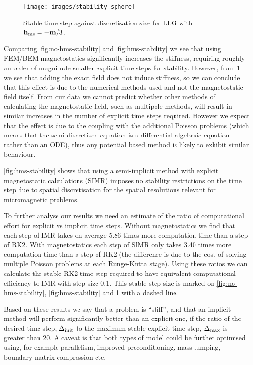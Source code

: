 \begin{figure}
  \centering
  \texttt{[image: images/stability\_sphere]}
  \caption{Stable time step against discretisation size for LLG with $\boldsymbol{\mathrm{h}}_{\text{ms}} = - \boldsymbol{\mathrm{m}} / 3$.
  }
  \label{fig:analytic-hms-stability}
\end{figure}

Comparing \cref{fig:no-hms-stability} and \ref{fig:hms-stability} we see that using FEM/BEM magnetostatics significantly increases the stiffness, requiring roughly an order of magnitude smaller explicit time steps for stability.
However, from \cref{fig:analytic-hms-stability} we see that adding the exact field does not induce stiffness, so we can conclude that this effect is due to the numerical methods used and not the magnetostatic field itself.
From our data we cannot predict whether other methods of calculating the magnetostatic field, such as multipole methods, will result in similar increases in the number of explicit time steps required.
However we expect that the effect is due to the coupling with the additional Poisson problems (which means that the semi-discretised equation is a differential algebraic equation \cite[371]{HairerWanner} rather than an ODE), thus any potential based method is likely to exhibit similar behaviour.

\cref{fig:hms-stability} shows that using a semi-implicit method with explicit magnetostatic calculations (SIMR) imposes no stability restrictions on the time step due to spatial discretisation for the spatial resolutions relevant for micromagnetic problems.

To further analyse our results we need an estimate of the ratio of computational effort for explicit vs implicit time steps. Without magnetostatics we find that each step of IMR takes on average 5.86 times more computation time than a step of RK2. With magnetostatics each step of SIMR only takes 3.40 times more computation time than a step of RK2 (the difference is due to the cost of solving multiple Poisson problems at each Runge-Kutta stage). Using these ratios we can calculate the stable RK2 time step required to have equivalent computational efficiency to IMR with step size 0.1. This stable step size is marked on \cref{fig:no-hms-stability}, \ref{fig:hms-stability} and \ref{fig:analytic-hms-stability} with a dashed line.

Based on these results we say that a problem is ``stiff'', and that an implicit method will perform significantly better than an explicit one, if the ratio of the desired time step, $\Delta_{\mathrm{init}}$ to the maximum stable explicit time step, $\Delta_{\mathrm{max}}$ is greater than 20.
A caveat is that both types of model could be further optimised using, for example parallelism, improved preconditioning, mass lumping, boundary matrix compression etc.

